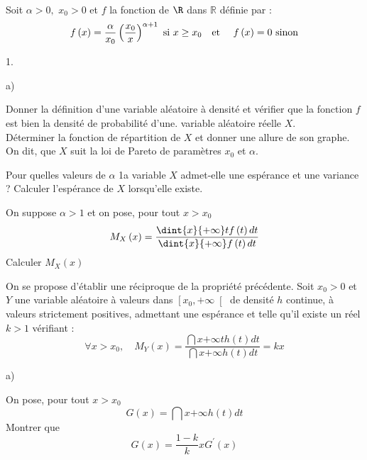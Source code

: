 \documentclass[11pt]{article}%
\begin{document}
\begin{exerciceAP}~\\
  Soit $\alpha >0,$ $x_{0}>0$ et $f$ la fonction de $\R$ dans
  $\mathbb{R}$ définie par :%
  \[
  f\left( x\right) =\frac{\alpha }{x_{0}}\left( \frac{x_{0}}{x}\right)
  ^{\alpha +1}\text{ si }x\geq x_{0} \text{\quad et\quad \ } f\left(
    x\right) = 0 \text{ sinon}
  \]

  \begin{noliste}{1.}
    \setlength{\itemsep}{2mm}
  \item 
    \begin{noliste}{a)}
    \setlength{\itemsep}{2mm}
    \item Donner la définition d'une variable aléatoire à densité et
      vérifier que la fonction $f$ est bien la densité de probabilité
      d'une. variable aléatoire réelle $X$.\\
      Déterminer la fonction de répartition de $X$ et donner une allure de
      son graphe.\\
      On dit, que $X$ suit la loi de Pareto de paramètres $x_{0}$ et
      $\alpha $.

    \item Pour quelles valeurs de $\alpha $ 1a variable $X$ admet-elle une
      espérance et une variance ? Calculer l'espérance de $X$ lorsqu'elle
      existe.

    \item On suppose $\alpha >1$ et on pose, pour tout $x>x_{0}$%
      \begin{equation*}
        M_{X}\left( x\right) =\frac{\dint{x}{+\infty }tf\left( t\right) dt}{%
          \dint{x}{+\infty }f\left( t\right) dt}
      \end{equation*}%
      Calculer $M_{X}\left( x\right) $
    \end{noliste}

  \item On se propose d'établir une réciproque de la propriété
    précédente. Soit $x_{0}>0$ et $Y$ une variable aléatoire à
    valeurs dans $\left[ x_{0},+\infty \right[ $ de densité $h$ continue, 
    à valeurs strictement positives, admettant une espérance et telle
    qu'il existe un réel $k>1$ vérifiant : 
    \begin{equation*}
      \forall x>x_{0},\quad M_{Y}\left( x\right) =\frac{\dint{x}{+\infty
        }th\left( t\right) dt}{\dint{x}{+\infty }h\left( t\right) dt}=kx
    \end{equation*}

    \begin{noliste}{a)}
    \setlength{\itemsep}{2mm}
    \item On pose, pour tout $x>x_{0}$%
      \begin{equation*}
        G\left( x\right) =\dint{x}{+\infty }h\left( t\right) dt
      \end{equation*}%
      Montrer que
      \begin{equation*}
        G\left( x\right) =\frac{1-k}{k}xG^{\prime }\left( x\right)
      \end{equation*}


\end{noliste}
\end{noliste}
\end{exerciceAP}
\end{document}
